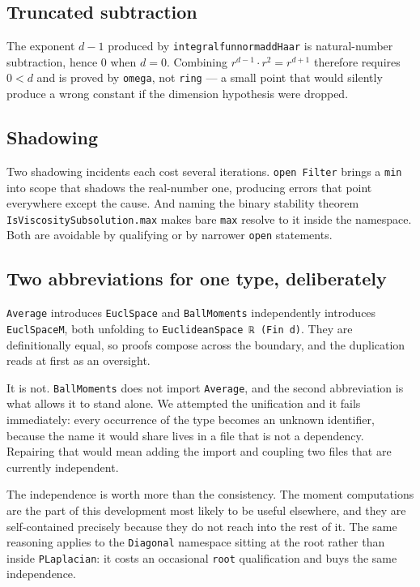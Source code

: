 \documentclass[11pt,reqno]{amsart}
\newcommand{\LEANREF}[1]{\texttt{\small\def\_{\textunderscore\allowbreak}#1}}
\theoremstyle{plain}
\theoremstyle{definition}
\begin{document}
\subsection{Truncated subtraction}
The exponent $d-1$ produced by \LEANREF{integral\_fun\_norm\_addHaar} is
natural-number subtraction, hence $0$ when $d=0$. Combining
$r^{d-1}\cdot r^2 = r^{d+1}$ therefore requires $0<d$ and is proved by
\texttt{omega}, not \texttt{ring} --- a small point that would silently produce
a wrong constant if the dimension hypothesis were dropped.

\subsection{Shadowing}
Two shadowing incidents each cost several iterations. \texttt{open Filter}
brings a \texttt{min} into scope that shadows the real-number one, producing
errors that point everywhere except the cause. And naming the binary stability
theorem \LEANREF{IsViscositySubsolution.max} makes bare \texttt{max} resolve to
it inside the namespace. Both are avoidable by qualifying or by narrower
\texttt{open} statements.

\subsection{Two abbreviations for one type, deliberately}
\texttt{Average} introduces \LEANREF{EuclSpace} and \texttt{BallMoments}
independently introduces \LEANREF{EuclSpaceM}, both unfolding to
\LEANREF{EuclideanSpace ℝ (Fin d)}. They are definitionally equal, so proofs
compose across the boundary, and the duplication reads at first as an
oversight.

It is not. \texttt{BallMoments} does not import \texttt{Average}, and the
second abbreviation is what allows it to stand alone. We attempted the
unification and it fails immediately: every occurrence of the type becomes an
unknown identifier, because the name it would share lives in a file that is
not a dependency. Repairing that would mean adding the import and coupling two
files that are currently independent.

The independence is worth more than the consistency. The moment computations
are the part of this development most likely to be useful elsewhere, and they
are self-contained precisely because they do not reach into the rest of it.
The same reasoning applies to the \texttt{Diagonal} namespace sitting at the
root rather than inside \texttt{PLaplacian}: it costs an occasional
\LEANREF{\_root\_} qualification and buys the same independence.
\end{document}
